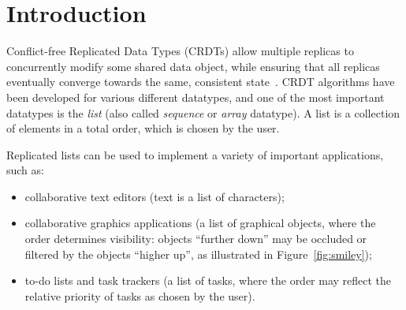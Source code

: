 \documentclass[sigplan,10pt]{acmart}
\begin{document}


\maketitle

\section{Introduction}

Conflict-free Replicated Data Types (CRDTs) allow multiple replicas to concurrently modify some shared data object, while ensuring that all replicas eventually converge towards the same, consistent state~\cite{Shapiro:2011un}.
CRDT algorithms have been developed for various different datatypes, and one of the most important datatypes is the \emph{list} (also called \emph{sequence} or \emph{array} datatype).
A list is a collection of elements in a total order, which is chosen by the user.

Replicated lists can be used to implement a variety of important applications, such as:
\begin{itemize}
    \item collaborative text editors (text is a list of characters);
    \item collaborative graphics applications (a list of graphical objects, where the order determines visibility: objects ``further down'' may be occluded or filtered by the objects ``higher up'', as illustrated in Figure~\ref{fig:smiley});
    \item to-do lists and task trackers (a list of tasks, where the order may reflect the relative priority of tasks as chosen by the user).
\end{itemize}
\end{document}

